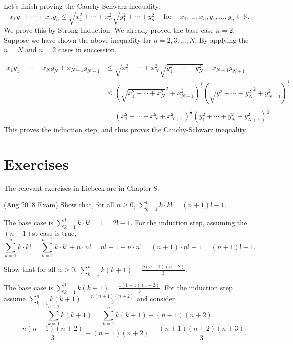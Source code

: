 \documentclass[11pt,dvipsnames]{book}
\numberwithin{equation}{section} %
\numberwithin{figure}{section} %
\numberwithin{table}{section} %
\begin{document}
Let's finish proving the Cauchy-Schwarz inequality:
\[
x_{1}y_{1}+\cdots + x_{n}y_{n}
\leq \sqrt{x_{1}^2+\cdots + x_{n}^{2}} \sqrt{y_{1}^2+\cdots + y_{n}^{2}} \;\;\; \mbox{ for } \;\;\; x_{1},...,x_{n},y_{1},...,y_{n}\in\mathbb{R}.
\]
We prove this by Strong Induction.  We already proved the base case $n=2$. Suppose we have shown the above inequality for $n=2,3,...,N$. By applying the $n=N$ and $n=2$ cases in succession,

\begin{align*}
x_{1}y_{1}+\cdots + x_{N}y_{N}+x_{N+1}y_{N+1}
& \leq \sqrt{x_{1}^2+\cdots + x_{N}^{2}} \sqrt{y_{1}^2+\cdots + y_{N}^{2}}+x_{N+1}y_{N+1}\\
& \leq  \left(  \sqrt{x_{1}^2+\cdots + x_{N}^{2}}^{2}+x_{N+1}^{2}\right)^{\frac{1}{2}}
\left(  \sqrt{y_{1}^2+\cdots + y_{N}^{2}}^{2}+y_{N+1}^{2}\right)^{\frac{1}{2}}\\
& =\left(x_{1}^{2}+\cdots + x_{N}^{2}+x_{N+1}^{2}\right)^{\frac{1}{2}}
\left(y_{1}^{2}+\cdots + y_{N}^{2}+y_{N+1}^{2}\right)^{\frac{1}{2}}
\end{align*}
This proves the induction step, and thus proves the Cauchy-Schwarz inequality. 

\section{Exercises}

The relevant exercises in Liebeck are in Chapter 8.  

\begin{exercise} 
(Aug 2018 Exam) Show that, for all $n\geq 0$, $\sum_{k=1}^{n} k\cdot k! = (n+1)!-1$. 
\begin{solution}
The base case is $\sum_{k=1}^{1} k\cdot k!=1=2!-1$. For the induction step, assuming the $(n-1)$st case is true,
\[
\sum_{k=1}^{n} k\cdot k! 
=\sum_{k=1}^{n-1} k\cdot k! + n\cdot n!
=n!-1+ n\cdot n!
=(n+1)\cdot n! -1 = (n+1)!-1.
\]
\end{solution}
\end{exercise}

\begin{exercise}
Show that for all $n\geq 0$, $\sum_{k=1}^{n} k(k+1) = \frac{n(n+1)(n+2)}{3}$. 
\begin{solution}
The base case is $\sum_{k=1}^{1} k(k+1) = \frac{1(1+1)(1+2)}{3}$.
For the induction step assume $\sum_{k=1}^{n} k(k+1) = \frac{n(n+1)(n+2)}{3}$ and consider
\[
\sum_{k=1}^{n+1} k(k+1) = 
\sum_{k=1}^{n} k(k+1) +(n+1)(n+2) \]
\[
= \frac{n(n+1)(n+2)}{3}+(n+1)(n+2) 
=\frac{(n+1)(n+2)(n+3)}{3}.
\]
\end{solution}
\end{exercise}
\end{document}
